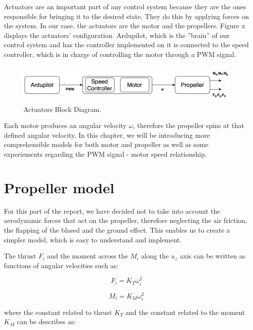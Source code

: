 Actuators are an important part of any control system because they are the ones responsible for bringing it to the desired state. They do this by applying forces on the system. In our case, the actuators are the motor and the propellers. Figure x displays the actuators' configuration. Ardupilot, which is the ''brain'' of our control system and has the controller implemented on it is connected to the speed controller, which is in charge of controlling the motor through a PWM signal. 

\begin{figure}[H]
  \centering
    \includegraphics[width=1\textwidth]{images/ablockd.png}
	\caption{Actuators Block Diagram.}
	\label{ablockd}
\end{figure}

Each motor produces an angular velocity $\omega$, therefore the propeller spins at that defined angular velocity. In this chapter, we will be introducing more comprehensible models for both motor and propeller as well as some experiements regarding the PWM signal - motor speed relationship.

\section{Propeller model}
For this part of the report, we have decided not to take into account the aerodynamic forces that act on the propeller, therefore neglecting the air friction, the flapping of the blased and the ground effect. This enables us to create a simpler model, which is easy to understand and implement.

The thrust $F_{i}$ and the moment across the $M_{i}$ along the $u_{z}$ axis can be written as functions of angular velocities such as:

\begin{equation}
	F_{i}=K_{T}\omega_{i}^{2}
\end{equation}

\begin{equation}
	M_{i}=K_{M}\omega_{i}^{2}
\end{equation}

where the constant related to thrust $K_{T}$ and the constant related to the moment $K_{M}$ can be describes as:

